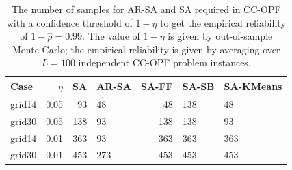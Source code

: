 \begin{table}[t]
\caption{The number of samples for AR-SA and SA required in CC-OPF with a confidence threshold of $1-\eta$ to get the empirical reliability of $1-\hat{\rho} = 0.99$. The value of $1-\eta$ is given by out-of-sample Monte Carlo; the empirical reliability is given by averaging over $L=100$ independent CC-OPF problem instances. 
    }
    \centering
        \begin{tabular}{|lr|rlrll|}
        \toprule
        Case & $\eta$ & SA & AR-SA & SA-FF & SA-SB & SA-KMeans \\
\midrule
grid14 & 0.05 & 93 & 48 & 48 & 138 & 48 \\
grid30 & 0.05 & 138 & 93 & 138 & 138 & 93 \\
grid14 & 0.01 & 363 & 93 & 363 & 363 & 363 \\
grid30 & 0.01 & 453 & 273 & 453 & 453 & 453 \\
\bottomrule
        \end{tabular}
    
    
    \label{tab:dyn_summary_results}
\end{table}

